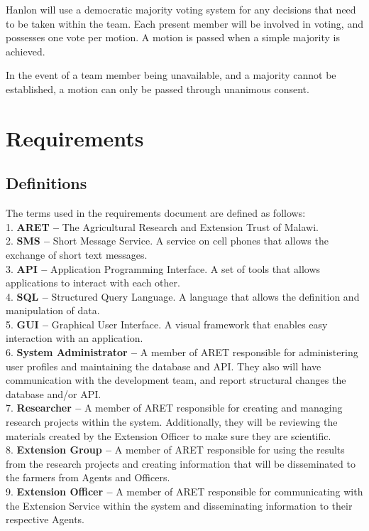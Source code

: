 \documentclass[12pt,letterpaper]{article}
\begin{document}
Hanlon will use a democratic majority voting system for any decisions that need to be taken within the team. Each present member will be involved in voting, and possesses one vote per motion. A motion is passed when a simple majority is achieved. \par

In the event of a team member being unavailable, and a majority cannot be established, a motion can only be passed through unanimous consent.

\clearpage
\section{Requirements}
\subsection{Definitions}
The terms used in the requirements document are defined as follows:\\
1. \textbf{ARET -- } The Agricultural Research and Extension Trust of Malawi. \\
2. \textbf{SMS -- } Short Message Service. A service on cell phones that allows the exchange of short text messages.\\
3. \textbf{API -- } Application Programming Interface. A set of tools that allows applications to interact with each other.\\
4. \textbf{SQL -- } Structured Query Language. A language that allows the definition and manipulation of data.\\
5. \textbf{GUI -- } Graphical User Interface. A visual framework that enables easy interaction with an application.\\
6. \textbf{System Administrator --} A member of ARET responsible for administering user profiles and maintaining the database and API. They also will have communication with the development team, and report structural changes the database and/or API.\\
7. \textbf{Researcher --} A member of ARET responsible for creating and managing research projects within the system. Additionally, they will be reviewing the materials created by the Extension Officer to make sure they are scientific.\\
8. \textbf{Extension Group --} A member of ARET responsible for using the results from the research projects and creating information that will be disseminated to the farmers from Agents and Officers.\\
9. \textbf{Extension Officer --} A member of ARET responsible for communicating with the Extension Service within the system and disseminating information to their respective Agents.\\
\end{document}

